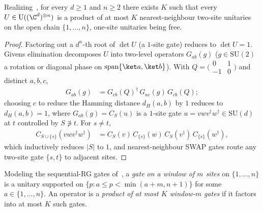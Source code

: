 \begin{theorem}
    \label{thm:qc_bounded_unitary_two_site_gates}
    \leanok
    Realizing~\cite[caption of Fig.~1]{Malz2024Preparation}, for every $d\ge1$ and $n\ge2$ there exists $K$ such that every $U\in\mathrm U((\C^d)^{\otimes n})$ is a product of at most $K$ nearest-neighbour two-site unitaries on the open chain $\{1,\dots,n\}$, one-site unitaries being free.
\end{theorem}
\begin{proof}
    \leanok
    Factoring out a $d^n$-th root of $\det U$ (a $1$-site gate) reduces to $\det U=1$. Givens elimination decomposes $U$ into two-level operators $G_{ab}(g)$ ($g\in\mathrm{SU}(2)$ a rotation or diagonal phase on $\operatorname{span}\{\ket a,\ket b\}$). With $Q=\bigl(\begin{smallmatrix}0&1\\-1&0\end{smallmatrix}\bigr)$ and distinct $a,b,c$,
    \begin{align}
        G_{ab}(g) & =G_{cb}(Q)^\dagger\,G_{ac}(g)\,G_{cb}(Q);
        \label{eq:qc_two_level_quarter_turn}
    \end{align}
    choosing $c$ to reduce the Hamming distance $d_H(a,b)$ by $1$ reduces to $d_H(a,b)=1$, where $G_{ab}(g)=C_S(u)$ is a $1$-site gate $u=vwv^\dagger w^\dagger\in\mathrm{SU}(d)$ at $t$ controlled by $S\not\ni t$. For $s\neq t$,
    \begin{align}
        C_{S\cup\{s\}}(vwv^\dagger w^\dagger)
         & =C_S(v)\,C_{\{s\}}(w)\,C_S(v^\dagger)\,C_{\{s\}}(w^\dagger),
        \label{eq:qc_controlled_commutator}
    \end{align}
    which inductively reduces $|S|$ to $1$, and nearest-neighbour SWAP gates route any two-site gate $\{s,t\}$ to adjacent sites.
\end{proof}

\begin{definition}
    \label{def:qc_window_gate}
    \leanok
    Modeling the sequential-RG gates of~\cite[paragraph ``The sequential-RG circuit'']{Malz2024Preparation}, a \emph{gate on a window of $m$ sites} on $\{1,\dots,n\}$ is a unitary supported on $\{p:a\le p<\min(a+m,n+1)\}$ for some $a\in\{1,\dots,n\}$. An operator is a \emph{product of at most $K$ window-$m$ gates} if it factors into at most $K$ such gates.
\end{definition}

